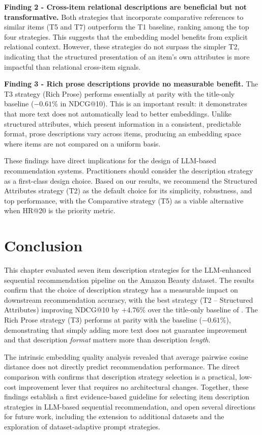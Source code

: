 \documentclass[12pt,a4paper]{report}
\begin{document}
\textbf{Finding 2 - Cross-item relational descriptions are beneficial but
not transformative.} Both strategies that incorporate comparative references
to similar items (T5 and T7) outperform the T1 baseline, ranking among the
top four strategies. This suggests that the embedding model benefits from
explicit relational context. However, these strategies do not surpass the
simpler T2, indicating that the structured presentation of an item's own
attributes is more impactful than relational cross-item signals.

\textbf{Finding 3 - Rich prose descriptions provide no measurable benefit.}
The T3 strategy (Rich Prose) performs essentially at parity with the
title-only baseline (\(-0.61\%\) in NDCG@10). This is an important result: it
demonstrates that more text does not automatically lead to better embeddings.
Unlike structured attributes, which present information in a consistent,
predictable format, prose descriptions vary across items, producing an
embedding space where items are not compared on a uniform basis.

These findings have direct implications for the design of LLM-based
recommendation systems. Practitioners should consider the description
strategy as a first-class design choice. Based on our results, we recommend the
Structured Attributes strategy (T2) as the default choice for its
simplicity, robustness, and top performance, with the Comparative
strategy (T5) as a viable alternative when HR@20 is the priority metric.

\section{Conclusion}
\label{sec:ch5conclusion}

\justifying
This chapter evaluated seven item description strategies for the
LLM-enhanced sequential recommendation pipeline on the Amazon Beauty dataset.
The results confirm that the choice of description strategy has a measurable
impact on downstream recommendation accuracy, with the best strategy (T2 --
Structured Attributes) improving NDCG@10 by \(+4.76\%\) over the title-only
baseline of \citep{boz2025}. The Rich Prose strategy (T3) performs at parity
with the baseline (\(-0.61\%\)), demonstrating that simply adding more text
does not guarantee improvement and that description \emph{format} matters more
than description \emph{length}.

The intrinsic embedding quality analysis revealed that average pairwise
cosine distance does not directly predict recommendation performance.
The direct comparison with \citep{boz2025} confirms that description strategy
selection is a practical, low-cost improvement lever that requires no
architectural changes. Together, these findings establish a first
evidence-based guideline for selecting item description strategies in
LLM-based sequential recommendation, and open several directions for future
work, including the extension to additional datasets and the exploration of
dataset-adaptive prompt strategies.
\end{document}
